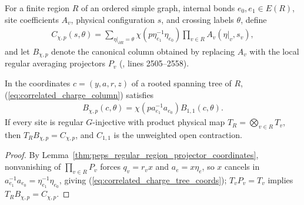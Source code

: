 \begin{definition}
    \label{def:peps_regular_correlated_charge_column}
    \leanok
    For a finite region $R$ of an ordered simple graph, internal bonds $e_0,e_1\in E(R)$, site coefficients $A_v$, physical configuration $s$, and crossing labels $\theta$, define
    \begin{align}
        C_{\chi,p}(s,\theta)
        =\sum_{\eta|_{\partial R}=\theta}
        \chi(p\eta_{e_1}^{-1}\eta_{e_0})
        \prod_{v\in R} A_v(\eta|_v,s_v), \label{eq:correlated_charge_column}
    \end{align}
    and let $B_{\chi,p}$ denote the canonical column obtained by replacing $A_v$ with the local regular averaging projectors $P_v$ (\cite[charge-pair creation]{Schuch2010PEPS}, lines 2505--2558).
\end{definition}

\begin{lemma}
    \label{thm:peps_regular_correlated_charge_coordinates}
    \leanok
    In the coordinates $c=(y,a,r,z)$ of a rooted spanning tree of $R$, (\ref{eq:correlated_charge_column}) satisfies
    \begin{align}
        B_{\chi,p}(c,\theta)
        =\chi(pa_{e_1}^{-1}a_{e_0}) B_{1,1}(c,\theta). \label{eq:correlated_charge_tree_coords}
    \end{align}
    If every site is regular $G$-injective with product physical map $T_R=\bigotimes_{v\in R}T_v$, then $T_R B_{\chi,p}=C_{\chi,p}$, and $C_{1,1}$ is the unweighted open contraction.
\end{lemma}
\begin{proof}\leanok
    By Lemma~\ref{thm:peps_regular_region_projector_coordinates}, nonvanishing of $\prod_{v\in R}P_v$ forces $q_v=r_v x$ and $a_e=x\eta_e$, so $x$ cancels in $a_{e_1}^{-1}a_{e_0}=\eta_{e_1}^{-1}\eta_{e_0}$, giving (\ref{eq:correlated_charge_tree_coords}); $T_vP_v=T_v$ implies $T_RB_{\chi,p}=C_{\chi,p}$.
\end{proof}

